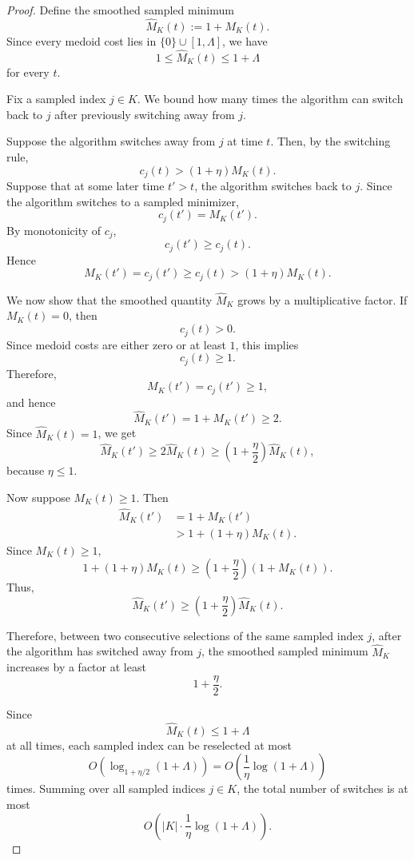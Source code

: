 \begin{proof}
Define the smoothed sampled minimum
\[
    \widehat M_K(t)
    :=
    1+M_K(t).
\]
Since every medoid cost lies in \(\{0\}\cup[1,\Lambda]\), we have
\[
    1\le \widehat M_K(t)\le 1+\Lambda
\]
for every \(t\).

Fix a sampled index \(j\in K\). We bound how many times the algorithm can switch back to \(j\) after previously switching away from \(j\).

Suppose the algorithm switches away from \(j\) at time \(t\). Then, by the switching rule,
\[
    c_j(t)>(1+\eta)M_K(t).
\]
Suppose that at some later time \(t'>t\), the algorithm switches back to \(j\). Since the algorithm switches to a sampled minimizer,
\[
    c_j(t')=M_K(t').
\]
By monotonicity of \(c_j\),
\[
    c_j(t')\ge c_j(t).
\]
Hence
\[
    M_K(t')
    =
    c_j(t')
    \ge
    c_j(t)
    >
    (1+\eta)M_K(t).
\]

We now show that the smoothed quantity \(\widehat M_K\) grows by a multiplicative factor. If \(M_K(t)=0\), then
\[
    c_j(t)>0.
\]
Since medoid costs are either zero or at least \(1\), this implies
\[
    c_j(t)\ge 1.
\]
Therefore,
\[
    M_K(t')=c_j(t')\ge 1,
\]
and hence
\[
    \widehat M_K(t')=1+M_K(t')\ge 2.
\]
Since \(\widehat M_K(t)=1\), we get
\[
    \widehat M_K(t')
    \ge
    2\widehat M_K(t)
    \ge
    \left(1+\frac{\eta}{2}\right)\widehat M_K(t),
\]
because \(\eta\le 1\).

Now suppose \(M_K(t)\ge 1\). Then
\[
\begin{aligned}
    \widehat M_K(t')
    &=1+M_K(t')\\
    &>
    1+(1+\eta)M_K(t).
\end{aligned}
\]
Since \(M_K(t)\ge 1\),
\[
    1+(1+\eta)M_K(t)
    \ge
    \left(1+\frac{\eta}{2}\right)(1+M_K(t)).
\]
Thus,
\[
    \widehat M_K(t')
    \ge
    \left(1+\frac{\eta}{2}\right)\widehat M_K(t).
\]

Therefore, between two consecutive selections of the same sampled index \(j\), after the algorithm has switched away from \(j\), the smoothed sampled minimum \(\widehat M_K\) increases by a factor at least
\[
    1+\frac{\eta}{2}.
\]

Since
\[
    \widehat M_K(t)\le 1+\Lambda
\]
at all times, each sampled index can be reselected at most
\[
    O\left(
        \log_{1+\eta/2}(1+\Lambda)
    \right)
    =
    O\left(
        \frac{1}{\eta}
        \log(1+\Lambda)
    \right)
\]
times. Summing over all sampled indices \(j\in K\), the total number of switches is at most
\[
    O\left(
        |K|\cdot
        \frac{1}{\eta}
        \log(1+\Lambda)
    \right).
\]
\end{proof}

